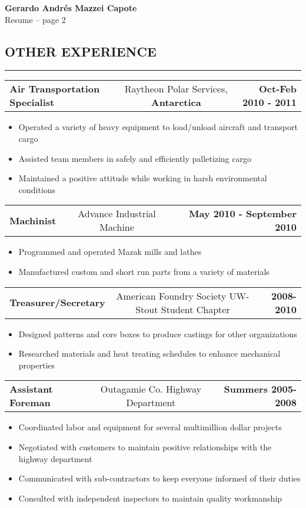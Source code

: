 \documentclass[11pt,letterpaper]{article}
\makeatletter
\newcommand{\headerrow}[3]
{\vspace{0.4em}
\noindent
\begin{tabular*}{\textwidth}{l @{\extracolsep{\fill}} cr}
	\textbf{#1} & %
	#2 &		  %
	\textbf{#3}\\ %
\end{tabular*}}
\makeatother
\begin{document}
\pagebreak %
\thispagestyle{empty} %

\begin{center}
	\LARGE \textbf{Gerardo Andrés Mazzei Capote} \\
	\normalsize Resume -- page 2
\end{center}

\subsection*{OTHER EXPERIENCE}

	\vspace{-0.5em}
	\hrule
	
	\headerrow
		{Air Transportation Specialist}
		{Raytheon Polar Services, \textbf{Antarctica}}
		{Oct-Feb 2010 - 2011}
	\begin{itemize}
		\item Operated a variety of heavy equipment to load/unload aircraft and transport cargo
		\item Assisted team members in safely and efficiently palletizing cargo
		\item Maintained a positive attitude while working in harsh environmental conditions
	\end{itemize}
	
	\headerrow
		{Machinist}
		{Advance Industrial Machine}
		{May 2010 - September 2010}
	\begin{itemize}
		\item Programmed and operated Mazak mills and lathes
		\item Manufactured custom and short run parts from a variety of materials
	\end{itemize}
	
	\headerrow
		{Treasurer/Secretary}
		{American Foundry Society UW-Stout Student Chapter}
		{2008-2010}
	\begin{itemize}
		\item Designed patterns and core boxes to produce castings for other organizations
		\item Researched materials and heat treating schedules to enhance mechanical properties
	\end{itemize}
	
	\headerrow
		{Assistant Foreman}
		{Outagamie Co. Highway Department}
		{Summers 2005-2008}
	\begin{itemize}
		\item Coordinated labor and equipment for several multimillion dollar projects
		\item Negotiated with customers to maintain positive relationships with the highway department
		\item Communicated with sub-contractors to keep everyone informed of their duties
		\item Consulted with independent inspectors to maintain quality workmanship
	\end{itemize}
	
\end{document}
